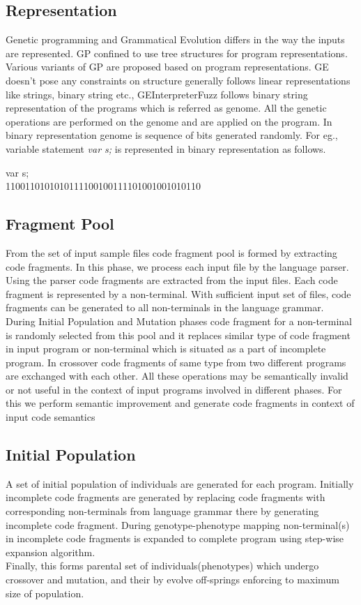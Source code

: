 \documentclass{sig-alternate}
\begin{document}
\subsection{Representation}
\indent Genetic programming and Grammatical Evolution differs in the way the inputs are represented. GP confined to use tree structures for program representations. Various variants of GP are proposed based on program representations. GE doesn't pose any constraints on structure generally follows linear representations like strings, binary string etc., GEInterpreterFuzz follows binary string representation of the programs which is referred as genome. All the genetic operations are performed on the genome and are applied on the program.  In binary representation genome is sequence of bits generated randomly. For eg., variable statement \textit{var s;} is represented in binary representation as follows.
\begin{center}
var s;
\\1100110101010111100100111101001001010110
\end{center}

\subsection{Fragment Pool}
\indent From the set of input sample files code fragment pool is formed by extracting code fragments. In this phase, we process each input file by the language parser. Using the parser code fragments are extracted from the input files. Each code fragment is represented by a non-terminal. With sufficient input set of files, code fragments can be generated to all non-terminals in the language grammar.\\
\indent During Initial Population and Mutation phases code fragment for a non-terminal is randomly selected from this pool and it replaces similar type of code fragment in input program or non-terminal which is situated as a part of incomplete program.  In crossover code fragments of same type from two different programs are exchanged with each other. All these operations may be semantically invalid  or not useful in the   context of input programs involved in different phases. For this we perform semantic improvement and generate code fragments in context of input code semantics

\subsection{Initial Population}
\indent A set of initial population of individuals  are generated for each program. Initially incomplete code fragments are generated by replacing code fragments with corresponding non-terminals from language grammar there by generating incomplete code fragment. During genotype-phenotype mapping non-terminal(s) in incomplete code fragments is expanded  to complete program using step-wise expansion algorithm. \\ Finally, this forms parental set of individuals(phenotypes) which undergo crossover and mutation, and their by evolve off-springs enforcing to maximum size of population.
\end{document}

